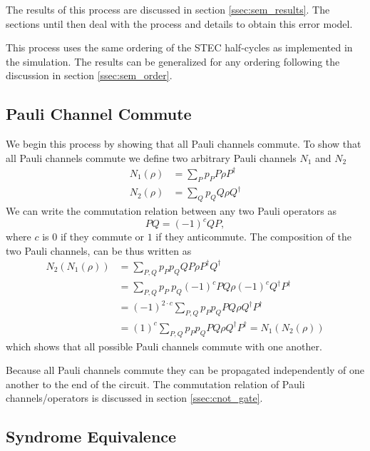 The results of this process are discussed in section \ref{ssec:sem_results}.
The sections until then deal with the process and details to obtain this error model. 

This process uses the same ordering of the STEC half-cycles as implemented in the simulation.
The results can be generalized for any ordering following the discussion in section \ref{ssec:sem_order}.


\subsection{Pauli Channel Commute}\label{ssec:pauli_channel_commute}

We begin this process by showing that all Pauli channels commute. 
To show that all Pauli channels commute we define two arbitrary Pauli channels $N_1$ and $N_2$
\begin{align}
    N_1 (\rho) &= \sum_P p_P {P} \rho {P}^\dag \\
    N_2 (\rho) &= \sum_Q p_Q {Q} \rho {Q}^\dag
\end{align}
We can write the commutation relation between any two Pauli operators as 
\begin{equation}
    {P}{Q} = (-1)^c {Q} {P},
\end{equation}
where $c$ is $0$ if they commute or $1$ if they anticommute.
The composition of the two Pauli channels, can be thus written as
\begin{align*}
    N_2  (N_1 (\rho)) & = \sum_{P,Q} p_P p_Q {Q} {P} \rho {P}^\dag {Q}^\dag \\
    & = \sum_{P,Q} p_P\  p_Q (-1)^c {P} {Q} \rho (-1)^c {Q}^\dag {P}^\dag \\
    & = (-1)^{2\cdot c} \sum_{P,Q} p_P p_Q  {P} {Q} \rho  {Q}^\dag {P}^\dag \\
    & = (1)^c \sum_{P,Q} p_P p_Q  {P} {Q} \rho  {Q}^\dag {P}^\dag
    = N_1  (N_2 (\rho))
\end{align*}
which shows that all possible Pauli channels commute with one another.

Because all Pauli channels commute they can be propagated independently of one another to the end of the circuit. 
The commutation relation of Pauli channels/operators is discussed in section \ref{ssec:cnot_gate}. 


\subsection{Syndrome Equivalence}\label{ssec:sem_syndrome_equivalence}

